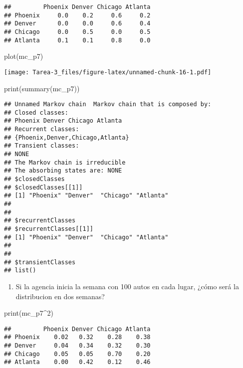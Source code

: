 \documentclass[
]{article}
\newenvironment{Shaded}{\begin{snugshade}}{\end{snugshade}}
\newcommand{\DecValTok}[1]{\textcolor[rgb]{0.00,0.00,0.81}{#1}}
\newcommand{\FunctionTok}[1]{\textcolor[rgb]{0.00,0.00,0.00}{#1}}
\newcommand{\NormalTok}[1]{#1}
\newcommand{\SpecialCharTok}[1]{\textcolor[rgb]{0.00,0.00,0.00}{#1}}
\providecommand{\tightlist}{%
  \setlength{\itemsep}{0pt}\setlength{\parskip}{0pt}}
\begin{document}
\begin{verbatim}
##         Phoenix Denver Chicago Atlanta
## Phoenix     0.0    0.2     0.6     0.2
## Denver      0.0    0.0     0.6     0.4
## Chicago     0.0    0.5     0.0     0.5
## Atlanta     0.1    0.1     0.8     0.0
\end{verbatim}

\begin{Shaded}
\begin{Highlighting}[]
\FunctionTok{plot}\NormalTok{(mc\_p7)}
\end{Highlighting}
\end{Shaded}

\texttt{[image: Tarea-3\_files/figure-latex/unnamed-chunk-16-1.pdf]}

\begin{Shaded}
\begin{Highlighting}[]
\FunctionTok{print}\NormalTok{(}\FunctionTok{summary}\NormalTok{(mc\_p7))}
\end{Highlighting}
\end{Shaded}

\begin{verbatim}
## Unnamed Markov chain  Markov chain that is composed by: 
## Closed classes: 
## Phoenix Denver Chicago Atlanta 
## Recurrent classes: 
## {Phoenix,Denver,Chicago,Atlanta}
## Transient classes: 
## NONE 
## The Markov chain is irreducible 
## The absorbing states are: NONE
## $closedClasses
## $closedClasses[[1]]
## [1] "Phoenix" "Denver"  "Chicago" "Atlanta"
## 
## 
## $recurrentClasses
## $recurrentClasses[[1]]
## [1] "Phoenix" "Denver"  "Chicago" "Atlanta"
## 
## 
## $transientClasses
## list()
\end{verbatim}

\begin{enumerate}
\def\labelenumi{\alph{enumi})}
\setcounter{enumi}{1}
\tightlist
\item
  Si la agencia inicia la semana con 100 autos en cada lugar, ¿cómo será
  la distribucion en dos semanas?
\end{enumerate}

\begin{Shaded}
\begin{Highlighting}[]
\FunctionTok{print}\NormalTok{(mc\_p7}\SpecialCharTok{\^{}}\DecValTok{2}\NormalTok{)}
\end{Highlighting}
\end{Shaded}

\begin{verbatim}
##         Phoenix Denver Chicago Atlanta
## Phoenix    0.02   0.32    0.28    0.38
## Denver     0.04   0.34    0.32    0.30
## Chicago    0.05   0.05    0.70    0.20
## Atlanta    0.00   0.42    0.12    0.46
\end{verbatim}
\end{document}
